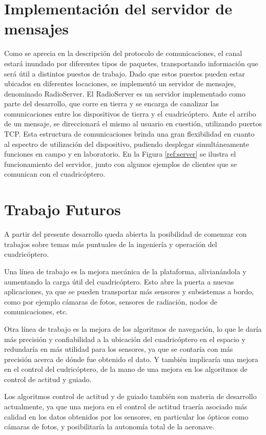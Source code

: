 \documentclass[a4paper, conference]{IEEEtran}
\begin{document}
\section{Implementación del servidor de mensajes}
Como se aprecia en la descripción del protocolo de comunicaciones, el canal estará inundado por diferentes tipos de paquetes, transportando información que será útil a distintos puestos de trabajo. Dado que estos puestos pueden estar ubicados en diferentes locaciones, se implementó un servidor de mensajes, denominado RadioServer. El RadioServer es un servidor implementado como parte del desarrollo, que corre en tierra y se encarga de canalizar las comunicaciones entre los dispositivos de tierra y el cuadricóptero. Ante el arribo de un mensaje, se direccionará el mismo al usuario en cuestión, utilizando puertos TCP. Esta estructura de comunicaciones brinda una gran flexibilidad en cuanto al espectro de utilización del dispositivo, pudiendo desplegar simultáneamente funciones en campo y en laboratorio.
En la Figura \ref{ref:server} se ilustra el funcionamiento del servidor, junto con algunos ejemplos de clientes que se comunican con el cuadricóptero.

\vspace{5 mm}

\section{Trabajo Futuros}

A partir del presente desarrollo queda abierta la posibilidad de comenzar con trabajos sobre temas más puntuales de la ingeniería y operación del cuadricóptero. 

Una línea de trabajo es la mejora mecánica de la plataforma, alivianándola y aumentando la carga útil del cuadricóptero. Esto abre la puerta a nuevas aplicaciones, ya que se pueden transportar más sensores y subsistemas a bordo, como por ejemplo cámaras de fotos, sensores de radiación, nodos de comunicaciones, etc.

Otra línea de trabajo es la mejora de los algoritmos de navegación, lo que le daría más precisión y confiabilidad a la ubicación del cuadricóptero en el espacio y redundaría en más utilidad para los sensores, ya que se contaría con más precisión acerca de dónde fue obtenido el dato. Y también implicaría una mejora en el control del cudricóptero, de la mano de una mejora en los algoritmos de control de actitud y guiado.

Los algoritmos control de actitud y de guiado también son materia de desarrollo actualmente, ya que una mejora en el control de actitud traería asociado más calidad en los datos obtenidos por los sensores, en particular los ópticos como cámaras de fotos, y posibilitaría la autonomía total de la aeronave.
\end{document}
